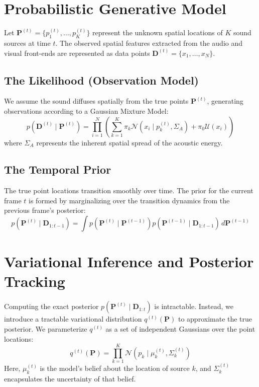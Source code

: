 \documentclass{article}
\begin{document}
\section{Probabilistic Generative Model}
Let $\mathbf{P}^{(t)} = \{p_1^{(t)}, \dots, p_K^{(t)}\}$ represent the unknown spatial locations of $K$ sound sources at time $t$. The observed spatial features extracted from the audio and visual front-ends are represented as data points $\mathbf{D}^{(t)} = \{x_1, \dots, x_N\}$.

\subsection{The Likelihood (Observation Model)}
We assume the sound diffuses spatially from the true points $\mathbf{P}^{(t)}$, generating observations according to a Gaussian Mixture Model:
\begin{equation}
    p(\mathbf{D}^{(t)} \mid \mathbf{P}^{(t)}) = \prod_{i=1}^N \left( \sum_{k=1}^K \pi_k \mathcal{N}(x_i \mid p_k^{(t)}, \Sigma_A) + \pi_0 \mathcal{U}(x_i) \right)
\end{equation}
where $\Sigma_A$ represents the inherent spatial spread of the acoustic energy.

\subsection{The Temporal Prior}
The true point locations transition smoothly over time. The prior for the current frame $t$ is formed by marginalizing over the transition dynamics from the previous frame's posterior:
\begin{equation}
    p(\mathbf{P}^{(t)} \mid \mathbf{D}_{1:t-1}) = \int p(\mathbf{P}^{(t)} \mid \mathbf{P}^{(t-1)}) p(\mathbf{P}^{(t-1)} \mid \mathbf{D}_{1:t-1}) \, d\mathbf{P}^{(t-1)}
\end{equation}

\section{Variational Inference and Posterior Tracking}
Computing the exact posterior $p(\mathbf{P}^{(t)} \mid \mathbf{D}_{1:t})$ is intractable. Instead, we introduce a tractable variational distribution $q^{(t)}(\mathbf{P})$ to approximate the true posterior. We parameterize $q^{(t)}$ as a set of independent Gaussians over the point locations:
\begin{equation}
    q^{(t)}(\mathbf{P}) = \prod_{k=1}^K \mathcal{N}\left(p_k \mid \mu_k^{(t)}, \Sigma_k^{(t)}\right)
\end{equation}
Here, $\mu_k^{(t)}$ is the model's belief about the location of source $k$, and $\Sigma_k^{(t)}$ encapsulates the uncertainty of that belief.
\end{document}
